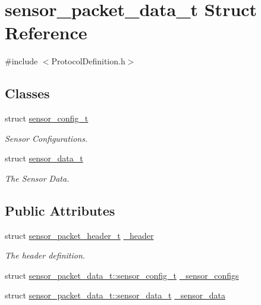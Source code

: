 \hypertarget{structsensor__packet__data__t}{\section{sensor\-\_\-packet\-\_\-data\-\_\-t \-Struct \-Reference}
\label{structsensor__packet__data__t}
}


{\ttfamily \#include $<$\-Protocol\-Definition.\-h$>$}

\subsection*{\-Classes}
\begin{DoxyCompactItemize}
\item 
struct \hyperlink{structsensor__packet__data__t_1_1sensor__config__t}{sensor\-\_\-config\-\_\-t}
\begin{DoxyCompactList}\small\item\em \-Sensor \-Configurations. \end{DoxyCompactList}\item 
struct \hyperlink{structsensor__packet__data__t_1_1sensor__data__t}{sensor\-\_\-data\-\_\-t}
\begin{DoxyCompactList}\small\item\em \-The \-Sensor \-Data. \end{DoxyCompactList}\end{DoxyCompactItemize}
\subsection*{\-Public \-Attributes}
\begin{DoxyCompactItemize}
\item 
struct \hyperlink{structsensor__packet__header__t}{sensor\-\_\-packet\-\_\-header\-\_\-t} \hyperlink{structsensor__packet__data__t_a514644f179865feda63838434c236b15}{\-\_\-header}
\begin{DoxyCompactList}\small\item\em \-The header definition. \end{DoxyCompactList}\item 
struct \*
\hyperlink{structsensor__packet__data__t_1_1sensor__config__t}{sensor\-\_\-packet\-\_\-data\-\_\-t\-::sensor\-\_\-config\-\_\-t} \hyperlink{structsensor__packet__data__t_a4b9984cdc2dd55735ea9167e9688c4ac}{\-\_\-sensor\-\_\-configs}
\item 
struct \*
\hyperlink{structsensor__packet__data__t_1_1sensor__data__t}{sensor\-\_\-packet\-\_\-data\-\_\-t\-::sensor\-\_\-data\-\_\-t} \hyperlink{structsensor__packet__data__t_a61f1229c9a538d88a1f0cad5049643b6}{\-\_\-sensor\-\_\-data}
\end{DoxyCompactItemize}
